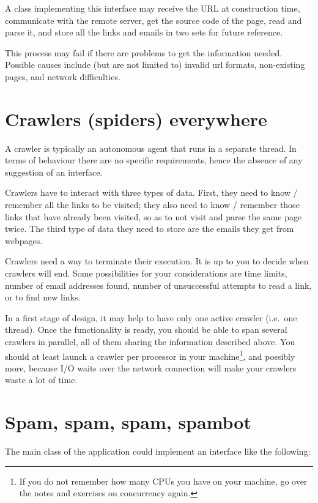\documentclass{article}
\begin{document}
A class implementing this interface may receive the URL at
construction time, communicate with the remote server, get the source
code of the page, read and parse it, and store all the links and
emails in two sets for future reference. 

This process may fail if there are problems to get the information
needed. Possible causes include (but are not limited to) invalid url
formats, non-existing pages, and network difficulties. 


\section{Crawlers (spiders) everywhere}
\label{sec:crawl-spid-everywh}

A crawler is typically an autonomous agent that runs in a separate
thread. In terms of behaviour there are no specific requirements,
hence the absence of any suggestion of an interface. 

Crawlers have to interact with three types of data. First, they need to
know / remember all the links to be visited; they also need to know /
remember those links that have already been visited, so as to not
visit and parse the same page twice. The third type of data they need
to store are the emails they get from webpages. 

Crawlers need a way to terminate their execution. It is up to you to
decide when crawlers will end. Some possibilities for your
considerations are time limits, number of email addresses found,
number of unsuccessful attempts to read a link, or to find new links.

In a first stage of design, it may help to have only one active
crawler (i.e.~one thread). Once the functionality is ready, you should
be able to span several crawlers in parallel, all of them sharing the
information described above. You should at least launch a crawler per
processor in your machine\footnote{If you do not remember how many
  CPUs you have on your machine, go over the notes and exercises on
  concurrency again.}, and possibly more, because I/O waits over the
network connection will make your crawlers waste a lot of time.


\section{Spam, spam, spam, spambot}
\label{sec:spambot}

The main class of the application could implement an interface like
the following: 
\end{document}
